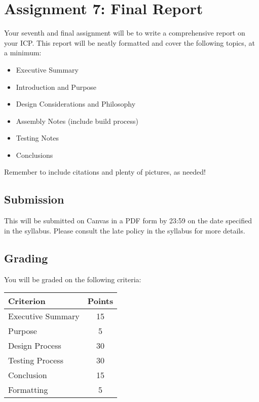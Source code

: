 \section*{Assignment 7: Final Report}
Your seventh and final assignment will be to write a comprehensive report on your ICP.
This report will be neatly formatted and cover the following topics, at a minimum:

\begin{itemize}
    \item Executive Summary
    \item Introduction and Purpose
    \item Design Considerations and Philosophy
    \item Assembly Notes (include build process)
    \item Testing Notes
    \item Conclusions
\end{itemize}

Remember to include citations and plenty of pictures, as needed!
    
    \subsection*{Submission}
    This will be submitted on Canvas in a PDF form by 23:59 on the date specified in the syllabus.
    Please consult the late policy in the syllabus for more details.

    \subsection*{Grading}
    You will be graded on the following criteria:

    \begin{table}[h!]
        \begin{tabular}{l | c}
            \toprule
            Criterion & Points \\
            \midrule
            Executive Summary & 15 \\
            Purpose & 5 \\
            Design Process & 30 \\
            Testing Process & 30 \\
            Conclusion & 15 \\
            Formatting & 5 \\
            \bottomrule
        \end{tabular}
    \end{table}
        

